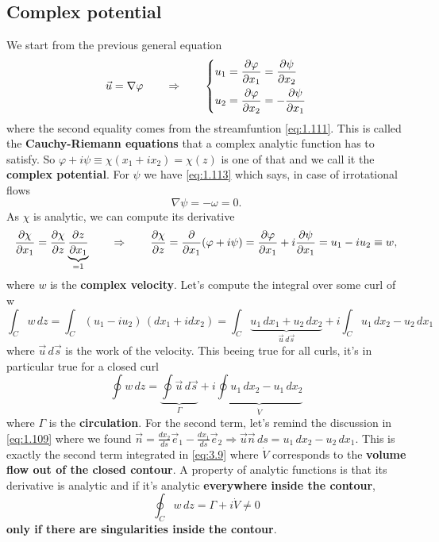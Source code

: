 	\subsection{Complex potential}
		We start from the previous general equation
		\begin{equation}
			\vec{u} = \nabla \varphi \qquad \Rightarrow \qquad
			\left\{
			\begin{aligned}
			u_1 &= \frac{\partial \varphi}{\partial x_1} = \frac{\partial \psi}{\partial x_2}\\
			u_2 &= \frac{\partial \varphi}{\partial x_2} = -\frac{\partial \psi}{\partial x_1}
			\end{aligned}
			\right.
			\label{eq:3.5}
		\end{equation}
		where the second equality comes from the streamfuntion \eqref{eq:1.111}. This is called the \textbf{Cauchy-Riemann equations} that a complex analytic function has to satisfy. So $\varphi + i \psi\equiv \chi (x_1 + ix_2)=\chi (z)$ is one of  that and we call it the \textbf{complex potential}. For $\psi$ we have \eqref{eq:1.113} which says, in case of irrotational flows 
		\begin{equation}
			\nabla \psi = - \omega = 0. 
		\end{equation}
		As $\chi$ is analytic, we can compute its derivative 
		\begin{equation}
			\frac{\partial \chi}{\partial x_1} = \frac{\partial \chi}{\partial z} \underbrace{\frac{\partial z}{\partial x_1}}_{=1} \qquad \Rightarrow \qquad \frac{\partial \chi}{\partial z} = \frac{\partial}{\partial x_1} (\varphi + i \psi) = \frac{\partial \varphi}{\partial x_1}+i\frac{\partial \psi}{\partial x_1} = u_1 - i u_2 \equiv w,
		\end{equation}
		where $w$ is the \textbf{complex velocity}. Let's compute the integral over some curl of w 
		\begin{equation}
			\int _C w\, dz= \int _C (u_1 - i u_2)\, (dx_1 + idx_2) = \int _C \underbrace{u_1\, dx_1 + u_2\, dx_2}_{\vec{u}\, d\vec{s}} + i \int _C u_1\, dx_2 - u_2\, dx_1
		\end{equation}
		where $\vec{u}\, d\vec{s}$ is the work of the velocity. This beeing true for all curls, it's in particular true for a closed curl 
		\begin{equation}
			\oint w\, dz = \underbrace{\oint \vec{u}\, d\vec{s}}_{\Gamma} + i \underbrace{\oint u_1\, dx_2 - u_1\, dx_2}_{\dot{V}}
			\label{eq:3.9}
		\end{equation}
		where $\Gamma$ is the \textbf{circulation}. For the second term, let's remind the discussion in \eqref{eq:1.109} where we found $\vec{n} = \frac{dx_2}{ds}\vec{e}_1-\frac{dx_1}{ds}\vec{e}_2 \Rightarrow \vec{u}\vec{n}\, ds = u_1\, dx_2 -u_2\, dx_1$. This is exactly the second term integrated in \eqref{eq:3.9} where $\dot{V}$ corresponds to the \textbf{volume flow out of the closed contour}. A property of analytic functions is that its derivative is analytic and if it's analytic \textbf{everywhere inside the contour}, 
		\begin{equation}
			\oint _C w\, dz = \Gamma +i\dot{V} \neq 0
		\end{equation}
		\textbf{only if there are singularities inside the contour}. 
		

